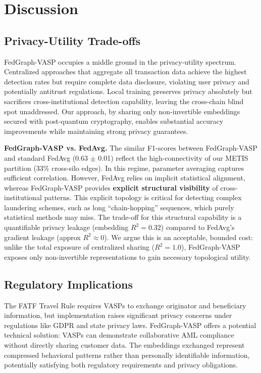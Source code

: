 \documentclass[conference]{IEEEtran}
\begin{document}
\section{Discussion}

\subsection{Privacy-Utility Trade-offs}
FedGraph-VASP occupies a middle ground in the privacy-utility spectrum. Centralized approaches that aggregate all transaction data achieve the highest detection rates but require complete data disclosure, violating user privacy and potentially antitrust regulations. Local training preserves privacy absolutely but sacrifices cross-institutional detection capability, leaving the cross-chain blind spot unaddressed. Our approach, by sharing only non-invertible embeddings secured with post-quantum cryptography, enables substantial accuracy improvements while maintaining strong privacy guarantees.

\textbf{FedGraph-VASP vs. FedAvg.} The similar F1-scores between FedGraph-VASP and standard FedAvg (0.63 $\pm$ 0.01) reflect the high-connectivity of our METIS partition (33\% cross-silo edges). In this regime, parameter averaging captures sufficient correlation. However, FedAvg relies on implicit statistical alignment, whereas FedGraph-VASP provides \textbf{explicit structural visibility} of cross-institutional patterns. This explicit topology is critical for detecting complex laundering schemes, such as long ``chain-hopping'' sequences, which purely statistical methods may miss. The trade-off for this structural capability is a quantifiable privacy leakage (embedding $R^2 = 0.32$) compared to FedAvg's gradient leakage (approx $R^2 \approx 0$). We argue this is an acceptable, bounded cost: unlike the total exposure of centralized sharing ($R^2=1.0$), FedGraph-VASP exposes only non-invertible representations to gain necessary topological utility.

\subsection{Regulatory Implications}
The FATF Travel Rule requires VASPs to exchange originator and beneficiary information, but implementation raises significant privacy concerns under regulations like GDPR and state privacy laws. FedGraph-VASP offers a potential technical solution: VASPs can demonstrate collaborative AML compliance without directly sharing customer data. The embeddings exchanged represent compressed behavioral patterns rather than personally identifiable information, potentially satisfying both regulatory requirements and privacy obligations.
\end{document}
